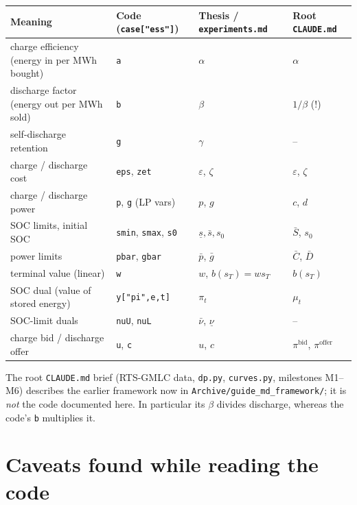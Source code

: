 \documentclass[10pt,a4paper]{article}
\newcommand{\code}[1]{\texttt{#1}}
\newcommand{\nuU}{\bar\nu}
\newcommand{\nuL}{\underline\nu}
\begin{document}
\begin{center}\small
\begin{tabular}{@{}llll@{}}
\toprule
Meaning & Code (\code{case["ess"]}) & Thesis / \code{experiments.md} & Root \code{CLAUDE.md} \\
\midrule
charge efficiency (energy in per MWh bought) & \code{a} & $\alpha$ & $\alpha$ \\
discharge factor (energy out per MWh sold) & \code{b} & $\beta$ & $1/\beta$ \textcolor{warn}{(!)} \\
self-discharge retention & \code{g} & $\gamma$ & -- \\
charge / discharge cost & \code{eps}, \code{zet} & $\varepsilon$, $\zeta$ & $\varepsilon$, $\zeta$ \\
charge / discharge power & \code{p}, \code{g} (LP vars) & $p$, $g$ & $c$, $d$ \\
SOC limits, initial SOC & \code{smin}, \code{smax}, \code{s0} & $\underline s,\bar s,s_0$ & $\bar S$, $s_0$ \\
power limits & \code{pbar}, \code{gbar} & $\bar p$, $\bar g$ & $\bar C$, $\bar D$ \\
terminal value (linear) & \code{w} & $w$, $b(s_T)=w s_T$ & $b(s_T)$ \\
SOC dual (value of stored energy) & \code{y["pi",e,t]} & $\pi_t$ & $\mu_t$ \\
SOC-limit duals & \code{nuU}, \code{nuL} & $\nuU$, $\nuL$ & -- \\
charge bid / discharge offer & \code{u}, \code{c} & $u$, $c$ & $\pi^{\text{bid}}$, $\pi^{\text{offer}}$ \\
\bottomrule
\end{tabular}
\end{center}
{\small The root \code{CLAUDE.md} brief (RTS-GMLC data, \code{dp.py}, \code{curves.py}, milestones M1--M6)
describes the earlier framework now in \code{Archive/guide\_md\_framework/}; it is \emph{not} the code
documented here. In particular its $\beta$ divides discharge, whereas the code's \code{b} multiplies it.}

\section{Caveats found while reading the code}
\end{document}
